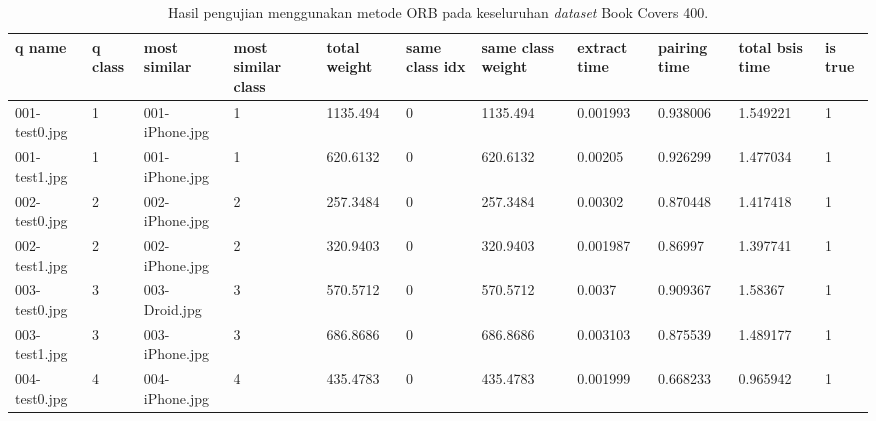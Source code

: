 \begin{landscape}
	\begin{longtable}{|p{2cm}|p{1cm}|p{2cm}|p{1cm}|p{2cm}|p{1cm}|p{2cm}|p{2cm}|p{2cm}|p{2cm}|p{1cm}|}
		\caption{Hasil pengujian menggunakan metode ORB pada keseluruhan \textit{dataset} Book Covers 400.} \\
		\hline
		\textbf{q name} & \textbf{q class} & \textbf{most similar} & \textbf{most similar class} & \textbf{total weight} & \textbf{same class idx} & \textbf{same class weight} & \textbf{extract time} & \textbf{pairing time} & \textbf{total bsis time} & \textbf{is true} \\ \hline
		001-test0.jpg   & 1                & 001-iPhone.jpg        & 1                           & 1135.494              & 0                       & 1135.494                   & 0.001993              & 0.938006              & 1.549221                 & 1                \\ \hline
		001-test1.jpg   & 1                & 001-iPhone.jpg        & 1                           & 620.6132              & 0                       & 620.6132                   & 0.00205               & 0.926299              & 1.477034                 & 1                \\ \hline
		002-test0.jpg   & 2                & 002-iPhone.jpg        & 2                           & 257.3484              & 0                       & 257.3484                   & 0.00302               & 0.870448              & 1.417418                 & 1                \\ \hline
		002-test1.jpg   & 2                & 002-iPhone.jpg        & 2                           & 320.9403              & 0                       & 320.9403                   & 0.001987              & 0.86997               & 1.397741                 & 1                \\ \hline
		003-test0.jpg   & 3                & 003-Droid.jpg         & 3                           & 570.5712              & 0                       & 570.5712                   & 0.0037                & 0.909367              & 1.58367                  & 1                \\ \hline
		003-test1.jpg   & 3                & 003-iPhone.jpg        & 3                           & 686.8686              & 0                       & 686.8686                   & 0.003103              & 0.875539              & 1.489177                 & 1                \\ \hline
		004-test0.jpg   & 4                & 004-iPhone.jpg        & 4                           & 435.4783              & 0                       & 435.4783                   & 0.001999              & 0.668233              & 0.965942                 & 1                \\ \hline

\end{longtable}
\end{landscape}
